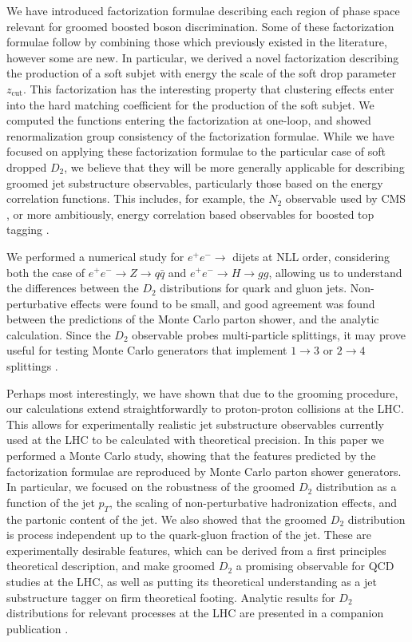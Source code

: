 \documentclass[a4paper,11pt]{article}
\def\zcut{z_{\text{cut}}}
\begin{document}
We have introduced factorization formulae describing each region of phase space relevant for groomed boosted boson discrimination. Some of these factorization formulae follow by combining those which previously existed in the literature, however some are new. In particular, we derived a novel factorization describing the production of a soft subjet with energy the scale of the soft drop parameter $\zcut$. This factorization has the interesting property that clustering effects enter into the hard matching coefficient for the production of the soft subjet. We computed the functions entering the factorization at one-loop, and showed renormalization group consistency of the factorization formulae. While we have focused on applying these factorization formulae to the particular case of soft dropped $D_2$, we believe that they will be more generally applicable for describing groomed jet substructure observables, particularly those based on the energy correlation functions. This includes, for example, the $N_2$ \cite{Moult:2016cvt} observable used by CMS \cite{CMS-PAS-EXO-17-001,CMS-PAS-HIG-17-010,CMS:2017cbv}, or more ambitiously, energy correlation based observables for boosted top tagging \cite{Larkoski:2013eya,Moult:2016cvt,Larkoski:2014zma}.

We performed a numerical study for $e^+e^-\to$ dijets at NLL order, considering both the case of $e^+e^- \to Z\to q\bar q$ and $e^+e^- \to H\to gg$, allowing us to understand the differences between the $D_2$ distributions for quark and gluon jets. Non-perturbative effects were found to be small, and good agreement was found between the predictions of the Monte Carlo parton shower, and the analytic calculation. Since the $D_2$ observable probes multi-particle splittings, it may prove useful for testing Monte Carlo generators that implement $1\to3$ \cite{Hoche:2017iem,Hoche:2017hno} or $2\to4$ splittings \cite{Li:2016yez}. 

Perhaps most interestingly, we have shown that due to the grooming procedure, our calculations extend straightforwardly to proton-proton collisions at the LHC. This allows for experimentally realistic jet substructure observables currently used at the LHC to be calculated with theoretical precision. In this paper we performed a Monte Carlo study, showing that the features predicted by the factorization formulae are reproduced by Monte Carlo parton shower generators. In particular, we focused on the robustness of the groomed $D_2$ distribution as a function of the jet $p_T$, the scaling of non-perturbative hadronization effects, and the partonic content of the jet. We also showed that the groomed $D_2$ distribution is process independent up to the quark-gluon fraction of the jet. These are experimentally desirable features, which can be derived from a first principles theoretical description, and make groomed $D_2$ a promising observable for QCD studies at the LHC, as well as putting its theoretical understanding as a jet substructure tagger on firm theoretical footing. Analytic results for $D_2$ distributions for relevant processes at the LHC are presented in a companion publication \cite{Larkoski:2017iuy}.  
\end{document}
